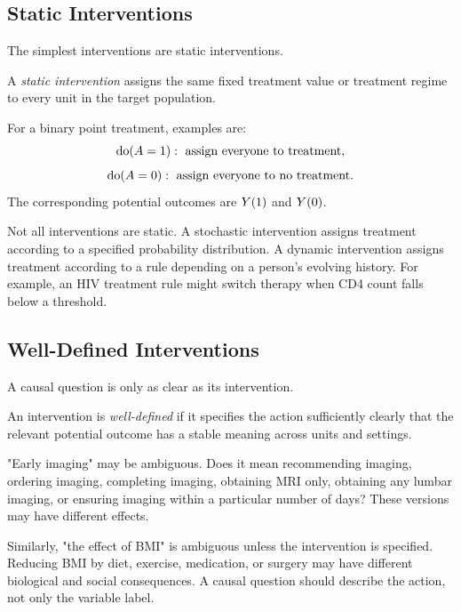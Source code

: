 \label{lec:2-9}

\subsection{Static Interventions}

The simplest interventions are static interventions.

\begin{definition}
A \emph{static intervention} assigns the same fixed treatment value or treatment regime to every unit in the target population.
\end{definition}

For a binary point treatment, examples are:
\[
\operatorname{do}(A=1): \text{ assign everyone to treatment},
\]
\[
\operatorname{do}(A=0): \text{ assign everyone to no treatment}.
\]
The corresponding potential outcomes are $Y(1)$ and $Y(0)$.

Not all interventions are static. A stochastic intervention assigns treatment according to a specified probability distribution. A dynamic intervention assigns treatment according to a rule depending on a person's evolving history. For example, an HIV treatment rule might switch therapy when CD4 count falls below a threshold.

\subsection{Well-Defined Interventions}

A causal question is only as clear as its intervention.

\begin{definition}
An intervention is \emph{well-defined} if it specifies the action sufficiently clearly that the relevant potential outcome has a stable meaning across units and settings.
\end{definition}

"Early imaging" may be ambiguous. Does it mean recommending imaging, ordering imaging, completing imaging, obtaining MRI only, obtaining any lumbar imaging, or ensuring imaging within a particular number of days? These versions may have different effects.

Similarly, "the effect of BMI" is ambiguous unless the intervention is specified. Reducing BMI by diet, exercise, medication, or surgery may have different biological and social consequences. A causal question should describe the action, not only the variable label.

